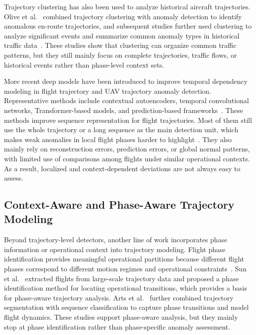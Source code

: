 \documentclass[iicol,pdflatex,sn-basic,Numbered]{sn-jnl}%
\theoremstyle{thmstyleone}%
\theoremstyle{thmstyletwo}%
\theoremstyle{thmstylethree}%
\begin{document}
Trajectory clustering has also been used to analyze historical aircraft trajectories.
Olive et al.~\cite{olive:hal-02345597,olive2020significant} combined trajectory clustering with anomaly detection to identify anomalous en-route trajectories, and subsequent studies further used clustering to analyze significant events and summarize common anomaly types in historical traffic data~\cite{aerospace13030209}. 
These studies show that clustering can organize common traffic patterns, but they still mainly focus on complete trajectories, traffic flows, or historical events rather than phase-level context sets.

More recent deep models have been introduced to improve temporal dependency modeling in flight trajectory and UAV trajectory anomaly detection.
Representative methods include contextual autoencoders, temporal convolutional networks, Transformer-based models, and prediction-based frameworks~\cite{chevrot2022cae,LUO2024103840,HUANG2025103478}.
These methods improve sequence representation for flight trajectories.
Most of them still use the whole trajectory or a long sequence as the main detection unit, which makes weak anomalies in local flight phases harder to highlight~\cite{lee2008trajectory,laxhammar2012online,yang2013trasmil}. 
They also mainly rely on reconstruction errors, prediction errors, or global normal patterns, with limited use of comparisons among flights under similar operational contexts.
As a result, localized and context-dependent deviations are not always easy to assess.

\subsection{Context-Aware and Phase-Aware Trajectory Modeling}

Beyond trajectory-level detectors, another line of work incorporates phase information or operational context into trajectory modeling.
Flight phase identification provides meaningful operational partitions because different flight phases correspond to different motion regimes and operational constraints~\cite{sun2017phaseidentification}. 
Sun et al.~\cite{sun2017phaseidentification} extracted flights from large-scale trajectory data and proposed a phase identification method for locating operational transitions, which provides a basis for phase-aware trajectory analysis. 
Arts et al.~\cite{arts2022trajectory} further combined trajectory segmentation with sequence classification to capture phase transitions and model flight dynamics.
These studies support phase-aware analysis, but they mainly stop at phase identification rather than phase-specific anomaly assessment.
\end{document}
